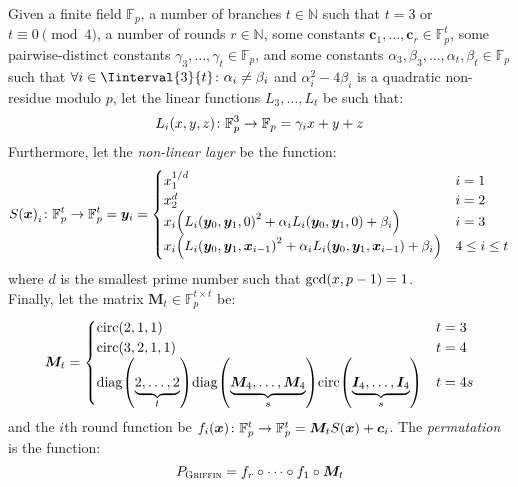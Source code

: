 \begin{definition}\label{def:griffin}
  Given a finite field \(\mathbb{F}_p\), a number of branches \(t \in \mathbb{N}\) such that 
  \(t = 3\) or \(t \equiv 0 \pmod{4}\), a number of rounds \(r \in \mathbb{N}\), some constants 
  \(\bm{c}_{1}, \dots, \bm{c}_{r} \in \mathbb{F}_{p}^{t}\), some pairwise-distinct 
  constants \(\gamma_3, \dots, \gamma_t \in \mathbb{F}_{p}\), and some constants 
  \(\alpha_3, \beta_3, \dots, \alpha_t, \beta_t \in \mathbb{F}_{p}\) such that 
  \(\forall i \in \Iinterval{3}{t}\colon \alpha_i \neq \beta_i\) and 
  \(\alpha_{i}^{2} - 4\beta_{i}\) is a quadratic non-residue modulo \(p\), 
  let the linear functions \(L_3, \dots, L_t\) be such that:
  \[\call{L_i}{x, y, z}\colon \mathbb{F}_p^3 \to \mathbb{F}_p = \gamma_{i}x + y + z\]
  Furthermore, let the \emph{non-linear layer} be the function:
  \[
    \call{S}{\bm{x}}_i\colon \mathbb{F}_{p}^{t} \to \mathbb{F}_{p}^{t} = \bm{y}_i =
    \begin{cases}
      x_{1}^{1/d}                                                         & i = 1         \\
      x_{2}^{d}                                                           & i = 2         \\
      x_{i}\Parens*{\call{L_i}{\bm{y}_0, \bm{y}_1, 0}^{2} + 
      \alpha_{i}\call{L_i}{\bm{y}_0, \bm{y}_1, 0} + \beta_i}              & i = 3         \\
      x_{i}\Parens*{\call{L_i}{\bm{y}_0, \bm{y}_1, \bm{x}_{i-1}}^{2} + 
      \alpha_{i}\call{L_i}{\bm{y}_0, \bm{y}_1, \bm{x}_{i-1}} + \beta_i}   & 4 \le i \le t
    \end{cases}
  \]
  where \(d\) is the smallest prime number such that \(\call{\gcd}{x, p - 1} = 1\).\\
  Finally, let the matrix \(\bm{M}_t \in \mathbb{F}_p^{t \times t}\) be:
  \[
    \bm{M}_t = 
    \begin{cases}
      \call{\circulant}{2, 1, 1} & t = 3 \\  
      \call{\circulant}{3, 2, 1, 1} & t = 4 \\
      \call{\diag}{\underbrace{2, \dots, 2}_{t}}
      \call{\diag}{\underbrace{\bm{M}_{4}, \dots, \bm{M}_4}_{s}}
      \call{\circulant}{\underbrace{\bm{I}_4, \dots, \bm{I}_4}_{s}}
      & t = 4s
    \end{cases}
  \]
  and the \(i\)th round function be
  \(\call{f_i}{\bm{x}}\colon \mathbb{F}_{p}^{t} \to \mathbb{F}_{p}^{t} = 
    \bm{M}_{t}\call{S}{\bm{x}} + \bm{c}_i\).
  The \emph{\Griffin{} permutation} is the function:
  \[
    P_{\textnormal{\textsc{Griffin}}} = f_{r} \circ \cdots \circ f_{1} \circ \bm{M}_{t}
  \]
\end{definition}

